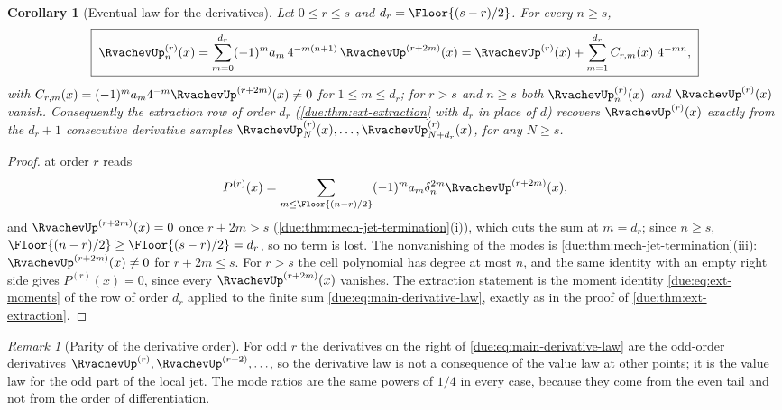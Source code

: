 \documentclass[11pt,oneside]{article}
\theoremstyle{plain}
\newtheorem{corollary}[theorem]{Corollary}
\theoremstyle{definition}
\theoremstyle{remark}
\newtheorem{remark}[theorem]{Remark}
\newcommand{\upn}[1]{\RvachevUp_{#1}}
\newcommand{\am}[1]{a_{#1}}                                 %
\newcommand{\Cr}[2]{C_{#1}\!\left(#2\right)}                %
\begin{document}
\begin{corollary}[Eventual law for the derivatives]
\label{due:cor:main-derivative}
Let $0\le r\le s$ and $d_r=\Floor{(s-r)/2}$.  For every $n\ge s$,
\begin{equation}
 \boxed{\;
 \upn{n}^{(r)}(x)
 =\sum_{m=0}^{d_r}(-1)^{m}\am{m}\,4^{-m(n+1)}\,\RvachevUp^{(r+2m)}(x)
 =\RvachevUp^{(r)}(x)+\sum_{m=1}^{d_r}\Cr{r,m}{x}\,4^{-mn},\;}
 \label{due:eq:main-derivative-law}
\end{equation}
with $\Cr{r,m}{x}=(-1)^{m}\am{m}4^{-m}\RvachevUp^{(r+2m)}(x)\ne0$ for
$1\le m\le d_r$; for $r>s$ and $n\ge s$ both $\upn{n}^{(r)}(x)$ and
$\RvachevUp^{(r)}(x)$ vanish.  Consequently the extraction row of order
$d_r$ (\cref{due:thm:ext-extraction} with $d_r$ in place of $d$) recovers
$\RvachevUp^{(r)}(x)$ exactly from the $d_r+1$ consecutive derivative
samples $\upn{N}^{(r)}(x),\ldots,\upn{N+d_r}^{(r)}(x)$, for any $N\ge s$.
\end{corollary}

\begin{proof}
 at order $r$ reads
\[
 P^{(r)}(x)=\sum_{m\le\Floor{(n-r)/2}}(-1)^{m}\am{m}\delta_n^{2m}
 \RvachevUp^{(r+2m)}(x),
\]
and $\RvachevUp^{(r+2m)}(x)=0$ once $r+2m>s$
(\cref{due:thm:mech-jet-termination}(i)), which cuts the sum at $m=d_r$;
since $n\ge s$, $\Floor{(n-r)/2}\ge\Floor{(s-r)/2}=d_r$, so no term is
lost.  The nonvanishing of the modes is
\cref{due:thm:mech-jet-termination}(iii): $\RvachevUp^{(r+2m)}(x)\ne0$ for
$r+2m\le s$.  For $r>s$ the cell polynomial has degree at most $n$, and
the same identity with an empty right side gives $P^{(r)}(x)=0$, since
every $\RvachevUp^{(r+2m)}(x)$ vanishes.  The extraction statement is the
moment identity \cref{due:eq:ext-moments} of the row of order $d_r$
applied to the finite sum \cref{due:eq:main-derivative-law}, exactly as in
the proof of \cref{due:thm:ext-extraction}.
\end{proof}

\begin{remark}[Parity of the derivative order]
\label{due:rmk:main-derivative-parity}
For odd $r$ the derivatives on the right of
\cref{due:eq:main-derivative-law} are the odd-order derivatives
$\RvachevUp^{(r)},\RvachevUp^{(r+2)},\ldots$, so the derivative law is not a
consequence of the value law at other points; it is the value law for the
odd part of the local jet.  The mode ratios are the same powers of $1/4$
in every case, because they come from the even tail and not from the order
of differentiation.
\end{remark}
\end{document}
